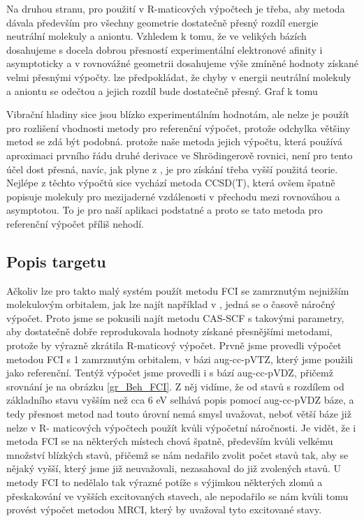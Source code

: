 Na druhou stranu, pro použití v R-maticových výpočtech je třeba, aby metoda dávala   
především pro všechny geometrie dostatečně přesný rozdíl energie neutrální molekuly a 
aniontu. Vzhledem k tomu, že ve velikých bázích dosahujeme s docela dobrou 
přesností experimentální elektronové afinity i asymptoticky a v rovnovážné geometrii 
dosahujeme výše zmíněné hodnoty získané velmi přesnými výpočty. lze předpokládat, že 
chyby v energii neutrální molekuly a aniontu se odečtou a jejich rozdíl bude 
dostatečně přesný. \? Graf k tomu \?

Vibrační hladiny sice jsou blízko experimentálním hodnotám, ale nelze je použít pro 
rozlišení vhodnosti metody pro referenční výpočet, protože odchylka většiny metod se 
zdá být podobná.
 protože naše metoda jejich výpočtu, která používá aproximaci prvního řádu druhé 
derivace ve Shrödingerově rovnici, není pro tento účel dost přesná, navíc, jak plyne 
z \cite{Koput_BeH}, je pro získání třeba vyšší použitá teorie.
Nejlépe z těchto výpočtů sice vychází metoda CCSD(T), která ovšem špatně popisuje 
molekuly pro mezijaderné vzdálenosti v přechodu mezi rovnováhou a asymptotou.
To je pro naší aplikaci podstatné a proto se tato metoda pro referenční výpočet příliš 
nehodí.

\subsection{Popis targetu}
Ačkoliv lze pro takto malý systém použít metodu FCI se zamrznutým nejnižším molekulovým 
orbitalem, jak lze najít například v \cite{BeH-Rmat}, jedná se o časově náročný 
výpočet. Proto jsme se pokusili najít metodu CAS-SCF s takovými parametry, aby 
dostatečně dobře reprodukovala hodnoty získané přesnějšími metodami, protože by výrazně 
zkrátila R-maticový výpočet.
Prvně jsme provedli výpočet metodou FCI s 1 zamrznutým orbitalem, v bázi aug-cc-pVTZ, 
který jsme použili jako referenční. Tentýž výpočet jsme provedli i s bází aug-cc-pVDZ, 
přičemž srovnání je na obrázku \ref{gr_Beh_FCI}. Z něj vidíme, že od stavů s rozdílem 
od základního stavu vyšším než cca 6 eV selhává popis pomocí aug-cc-pVDZ báze, a tedy 
přesnost metod nad touto úrovní nemá smysl uvažovat, neboť větší báze již nelze v R-
maticových výpočtech použít kvůli výpočetní náročnosti. Je vidět, že i metoda FCI se na 
některých místech chová špatně, především kvůli velkému množství blízkých stavů, 
přičemž se nám nedařilo zvolit počet stavů tak, aby se nějaký vyšší, který jsme již 
neuvažovali, nezasahoval do již zvolených stavů. U metody FCI to nedělalo tak výrazné 
potíže s výjimkou některých zlomů a přeskakování ve vyšších excitovaných stavech, ale  
nepodařilo se nám kvůli tomu provést výpočet metodou MRCI, který by uvažoval tyto 
excitované stavy.

